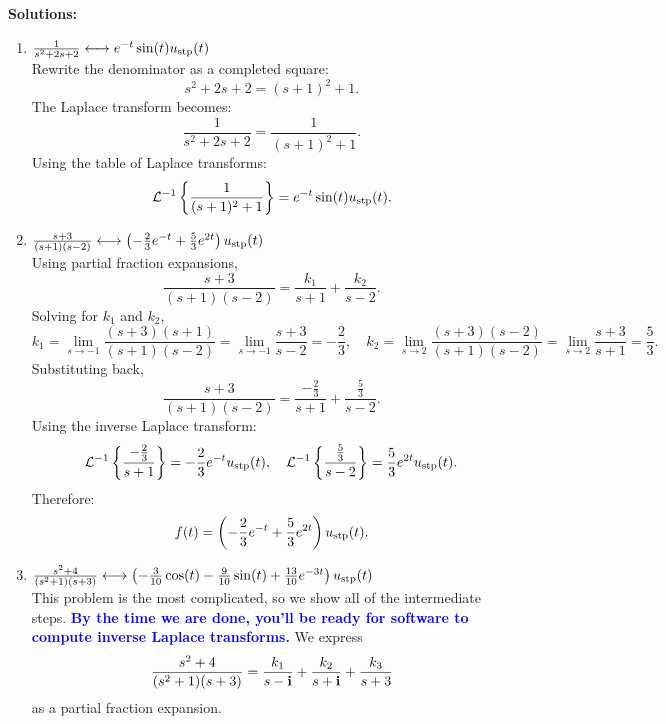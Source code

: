 \textbf{Solutions:}
\begin{enumerate}
\renewcommand{\labelenumi}{(\alph{enumi})}
\setlength{\itemsep}{.2cm}
    \item \Ans \quad \(\frac{1}{s^2 + 2s + 2} \longleftrightarrow e^{-t} \sin(t) u_{\rm stp}(t)\)\\
    
    Rewrite the denominator as a completed square:
    \[
    s^2 + 2s + 2 = (s + 1)^2 + 1.
    \]
    The Laplace transform becomes:
    \[
    \frac{1}{s^2 + 2s + 2} = \frac{1}{(s + 1)^2 + 1}.
    \]
    Using the table of Laplace transforms:
    \[
    \mathcal{L}^{-1}\left\{\frac{1}{(s + 1)^2 + 1}\right\} = e^{-t} \sin(t) u_{\rm stp}(t).
    \]

    \item \Ans \quad \(\frac{s + 3}{(s + 1)(s - 2)} \longleftrightarrow \left( -\frac{2}{3} e^{-t} + \frac{5}{3} e^{2t} \right) u_{\rm stp}(t)\)\\
    
Using partial fraction expansions,
\[
\frac{s + 3}{(s + 1)(s - 2)} = \frac{k_1}{s + 1} + \frac{k_2}{s - 2}.
\]
Solving for \(k_1\) and \(k_2\),
\[
k_1 = \lim_{s \to -1} \frac{(s + 3)(s + 1)}{(s + 1)(s - 2)} = \lim_{s \to -1} \frac{s + 3}{s - 2} = -\frac{2}{3}, \quad
k_2 = \lim_{s \to 2} \frac{(s + 3)(s - 2)}{(s + 1)(s - 2)} = \lim_{s \to 2} \frac{s + 3}{s + 1} = \frac{5}{3}.
\]
Substituting back,
\[
\frac{s + 3}{(s + 1)(s - 2)} = \frac{-\frac{2}{3}}{s + 1} + \frac{\frac{5}{3}}{s - 2}.
\]
Using the inverse Laplace transform:
\[
\mathcal{L}^{-1}\left\{\frac{-\frac{2}{3}}{s + 1}\right\} = -\frac{2}{3} e^{-t} u_{\rm stp}(t), \quad
\mathcal{L}^{-1}\left\{\frac{\frac{5}{3}}{s - 2}\right\} = \frac{5}{3} e^{2t} u_{\rm stp}(t).
\]
Therefore:
\[
f(t) = \left(-\frac{2}{3} e^{-t} + \frac{5}{3} e^{2t}\right) u_{\rm stp}(t).
\]


    \item \Ans \quad \(\frac{s^2 + 4}{(s^2 + 1)(s + 3)} \longleftrightarrow  \left(-\frac{3}{10} \cos(t) - \frac{9}{10} \sin(t) + \frac{13}{10} e^{-3t}\right) u_{\rm stp}(t) \)\\
    
This problem is the most complicated, so we show all of the intermediate steps. \textcolor{blue}{\bf By the time we are done, you'll be ready for software to compute inverse Laplace transforms.} We express
\[
\frac{s^2 + 4}{(s^2 + 1)(s + 3)} = \frac{k_1}{s - \mathop{\bm{\mathrm i}}} + \frac{k_2}{s + \mathop{\bm{\mathrm i}}} + \frac{k_3}{s + 3}
\]
as a partial fraction expansion.





\end{enumerate}
